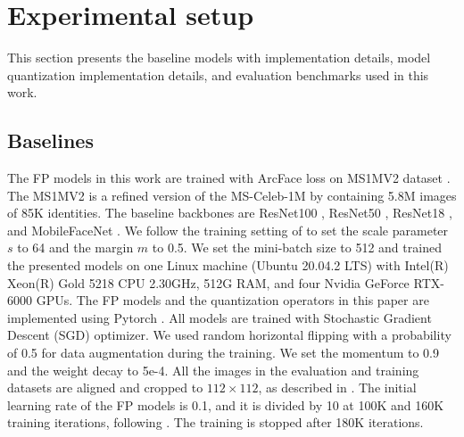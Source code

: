 \documentclass[a4paper,conference]{IEEEtran}
\begin{document}
\vspace{-1mm}
\section{Experimental setup}
\label{sec:exp}
\vspace{-1mm}
This section presents the baseline models with implementation details, model quantization implementation details, and evaluation benchmarks used in this work. 


\vspace{-1mm}
\subsection{Baselines}
\label{sec:exp_baseline}
\vspace{-1mm}
The FP models in this work are trained with ArcFace loss \cite{deng2019arcface} on MS1MV2 dataset \cite{guo2016ms,deng2019arcface}. 
The MS1MV2 is a refined version of the MS-Celeb-1M \cite{guo2016ms} by \cite{deng2019arcface} containing 5.8M images of 85K identities. 
The baseline backbones are ResNet100 \cite{resnet,deng2019arcface}, ResNet50 \cite{resnet,deng2019arcface}, ResNet18 \cite{resnet,deng2019arcface}, and MobileFaceNet \cite{mobilefacenet}. 
We follow the training setting of \cite{deng2019arcface} to set the scale parameter $s$ to 64 and the margin $m$ to 0.5. 
We set the mini-batch size to 512 and trained the presented models on one Linux machine (Ubuntu 20.04.2 LTS) with Intel(R) Xeon(R) Gold 5218 CPU 2.30GHz, 512G RAM, and four Nvidia GeForce RTX-6000 GPUs. 
The FP models and the quantization operators in this paper are implemented using Pytorch \cite{NEURIPS2019_9015}.
All models are trained with Stochastic Gradient Descent (SGD) optimizer.
We used random horizontal flipping with a probability of 0.5 for data augmentation during the training.
We set the momentum to 0.9 and the weight decay to 5e-4. 
All the images in the evaluation and training datasets are aligned and cropped to $112 \times 112$, as described in \cite{deng2019arcface}.
The initial learning rate of the FP models is 0.1, and it is divided by 10 at 100K and 160K training iterations, following \cite{deng2019arcface}. The training is stopped after 180K iterations.
\end{document}

